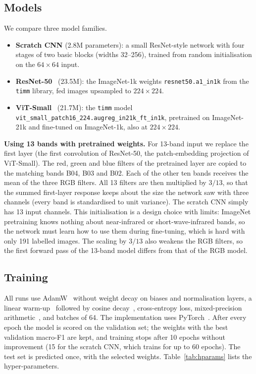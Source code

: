 \documentclass[twoside,a4paper,11pt]{article}
\begin{document}
\subsection{Models}
\label{sec:models}
We compare three model families.
\begin{itemize}
\item \textbf{Scratch CNN} (2.8M parameters): a small ResNet-style network with four stages of two basic blocks (widths 32--256), trained from random initialisation on the $64\times64$ input.
\item \textbf{ResNet-50}~\cite{he2016resnet} (23.5M): the ImageNet-1k weights \texttt{resnet50.a1\_in1k} from the \texttt{timm} library, fed images upsampled to $224\times224$.
\item \textbf{ViT-Small}~\cite{dosovitskiy2021vit} (21.7M): the \texttt{timm} model \texttt{vit\_small\_patch16\_224.}\allowbreak\texttt{augreg\_in21k\_ft\_in1k}, pretrained on ImageNet-21k and fine-tuned on ImageNet-1k, also at $224\times224$.
\end{itemize}

\textbf{Using 13 bands with pretrained weights.} For 13-band input we replace the first layer (the first convolution of ResNet-50, the patch-embedding projection of ViT-Small). The red, green and blue filters of the pretrained layer are copied to the matching bands B04, B03 and B02. Each of the other ten bands receives the mean of the three RGB filters. All 13 filters are then multiplied by $3/13$, so that the summed first-layer response keeps about the size the network saw with three channels (every band is standardised to unit variance). The scratch CNN simply has 13 input channels. This initialisation is a design choice with limits: ImageNet pretraining knows nothing about near-infrared or short-wave-infrared bands, so the network must learn how to use them during fine-tuning, which is hard with only 191 labelled images. The scaling by $3/13$ also weakens the RGB filters, so the first forward pass of the 13-band model differs from that of the RGB model.

\subsection{Training}
All runs use AdamW~\cite{loshchilov2019adamw} without weight decay on biases and normalisation layers, a linear warm-up~\cite{goyal2017warmup} followed by cosine decay~\cite{loshchilov2017sgdr}, cross-entropy loss, mixed-precision arithmetic~\cite{micikevicius2018mixed}, and batches of 64. The implementation uses PyTorch~\cite{paszke2019pytorch}. After every epoch the model is scored on the validation set; the weights with the best validation macro-F1 are kept, and training stops after 10 epochs without improvement (15 for the scratch CNN, which trains for up to 60 epochs). The test set is predicted once, with the selected weights. Table~\ref{tab:hparams} lists the hyper-parameters.
\end{document}
